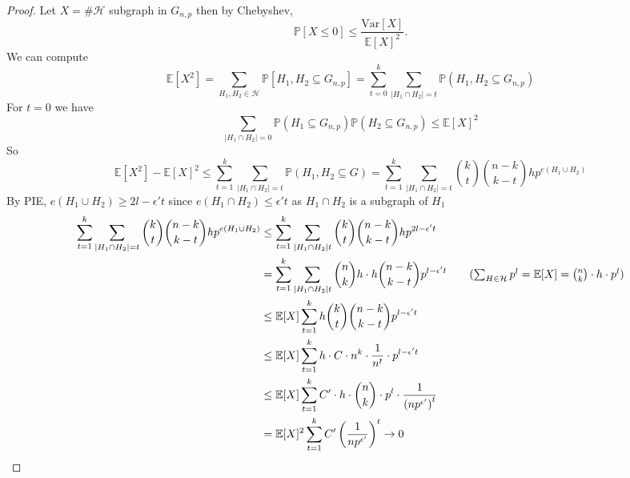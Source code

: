 \documentclass[a4paper]{article}
\begin{document}
\begin{proof}
    Let $X=\#\mathcal{H}$ subgraph in $G_{n,p}$ then 
    by Chebyshev, $$\mathbb{P}[X\leq 0]\leq \frac{\text{Var}[X]}{\mathbb{E}[X]^2}.$$
    We can compute $$\mathbb{E}[X^2]=\sum_{H_1,H_2\in \mathcal{H}}\mathbb{P}[H_1,H_2\subseteq G_{n,p}]=\sum_{t=0}^{k}\sum_{|H_1\cap H_2|=t}\mathbb{P}(H_1,H_2\subseteq G_{n,p})$$
    For $t=0$ we have $$\sum_{|H_1\cap H_2|=0}\mathbb{P}(H_1\subseteq G_{n,p})\mathbb{P}(H_2\subseteq G_{n,p})\leq \mathbb{E}[X]^2$$
    So $$\mathbb{E}[X^2]-\mathbb{E}[X]^2\leq \sum_{t=1}^{k}\sum_{|H_1\cap H_2|=t}\mathbb{P}(H_1,H_2\subseteq G)=\sum_{t=1}^{k}\sum_{|H_1\cap H_2|=t}{k \choose t}{n-k \choose k-t}hp^{e(H_1\cup H_2)}$$
    By PIE, $e(H_1\cup H_2)\geq 2l-\epsilon't$ since $e(H_1\cap H_2)\leq \epsilon't$ as $H_1\cap H_2$ is a subgraph of $H_1$
    \begin{align*}
        \sum_{t=1}^{k}\sum_{|H_1\cap H_2|=t}{k \choose t}{n-k \choose k-t}hp^{e(H_1\cup H_2)}&\leq \sum_{t=1}^{k}\sum_{|H_1\cap H_2|t}{k \choose t}{n-k \choose k-t}hp^{2l-\epsilon't}\\
        &=\sum_{t=1}^{k}\sum_{|H_1\cap H_2|t}{n \choose k}h\cdot h{n-k \choose k-t}p^{l-\epsilon't}\tag{$\sum_{H\in \mathcal{H}}p^l=\mathbb{E}[X]={n \choose k}\cdot h \cdot p^l$}\\ 
        &\leq\mathbb{E}[X] \sum_{t=1}^{k}h{k \choose t}{n-k \choose k-t}p^{l-\epsilon't}\\
        &\leq \mathbb{E}[X]\sum_{t=1}^k h\cdot C \cdot n^k \cdot \frac{1}{n^t}\cdot p^{l-\epsilon't}\\
        &\leq \mathbb{E}[X]\sum_{t=1}^k C' \cdot h \cdot {n \choose k}\cdot p^l \cdot \frac{1}{\left ( np^{\epsilon'}\right )^t }\\
        &=\mathbb{E}[X]^2\sum_{t=1}^kC'\left (\frac{1}{np^{\epsilon'}} \right )^t\to 0
    \end{align*}
\end{proof}
\end{document}
